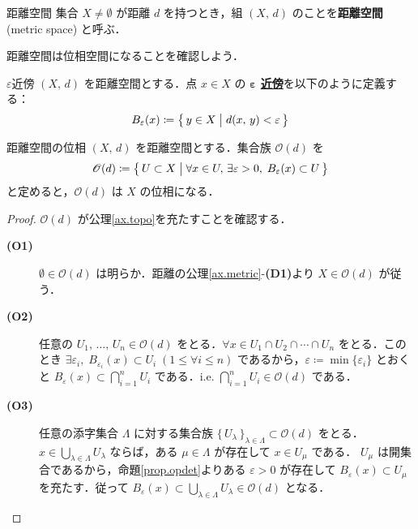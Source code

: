 \documentclass[geometry_main]{subfiles}
\begin{document}
\begin{mydef}[label=def:metric-space]{距離空間}
	集合 $X \neq \emptyset$ が距離 $d$ を持つとき，組 $(X,\, d)$ のことを\textbf{距離空間} (metric space) と呼ぶ．
\end{mydef}

距離空間は位相空間になることを確認しよう．

\begin{mydef}[label=def:epsilon-neighbourhood]{$\varepsilon$近傍}
	$(X,\, d)$ を距離空間とする．点 $x \in X$ の\textbf{ $\bm{\varepsilon}$ \hyperref[def:neighborhood]{近傍}}を以下のように定義する：
	\begin{align}
		B_\varepsilon (x) \coloneqq \bigl\{\, y \in X \bigm| d(x,\, y) < \varepsilon \,\bigr\}
	\end{align}
\end{mydef}

\begin{mytheo}[label=thm.metrictopo]{距離空間の位相}
	$(X,\, d)$ を距離空間とする．集合族 $\mathscr{O}(d)$ を
	\begin{align}
		\mathscr{O}(d) \coloneqq \bigl\{\, U \subset X \bigm| \forall x \in U,\, \exists \varepsilon > 0,\; B_\varepsilon (x) \subset U \,\bigr\}
	\end{align}
	と定めると，$\mathscr{O}(d)$ は $X$ の位相になる．
\end{mytheo}
\begin{proof}
	$\mathscr{O}(d)$ が公理\ref{ax.topo}を充たすことを確認する．
	\begin{description}
		\item[\textbf{(O1)}] $\emptyset \in \mathscr{O}(d)$ は明らか．距離の公理\ref{ax.metric}-\textbf{(D1)}より $X \in \mathscr{O}(d)$ が従う．
		\item[\textbf{(O2)}] 任意の $U_1,\, \dots ,\, U_n \in \mathscr{O}(d)$ をとる．$\forall x \in U_1 \cap U_2 \cap \cdots \cap U_n$ をとる．このとき $\exists \varepsilon_i,\; B_{\varepsilon_i} (x) \subset U_i \; (1 \le \forall i \le n)$ であるから，$\varepsilon \coloneqq \min \{ \varepsilon_i \}$ とおくと $B_{\varepsilon} (x) \subset \bigcap_{i=1}^n U_i $ である．i.e. $\bigcap_{i=1}^n U_i \in \mathscr{O}(d)$ である．
		\item[\textbf{(O3)}] 任意の添字集合 $\Lambda$ に対する集合族 $\bigl\{\, U_\lambda \,\bigr\}_{\lambda \in \Lambda} \subset \mathscr{O}(d)$ をとる．$x \in \bigcup_{\lambda \in \Lambda} U_\lambda $ ならば，ある $\mu \in \Lambda$ が存在して $x \in U_\mu$ である．
		$U_\mu$ は開集合であるから，命題\ref{prop.opdet}よりある $\varepsilon > 0$ が存在して $B_\varepsilon(x) \subset U_\mu$ を充たす．従って $B_\varepsilon (x) \subset \bigcup_{\lambda \in \Lambda} U_\lambda \in \mathscr{O}(d)$ となる．
	\end{description}
\end{proof}
\end{document}
